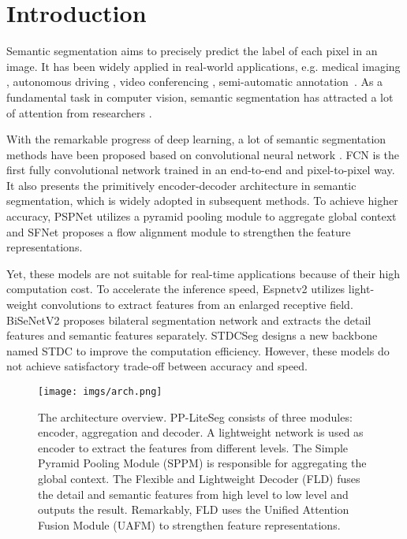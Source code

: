 \documentclass[10pt,twocolumn,letterpaper]{article}
\begin{document}
\section{Introduction}
\label{sec:introdution}



Semantic segmentation aims to precisely predict the label of each pixel in an image.
It has been widely applied in real-world applications, e.g. medical imaging \cite{zhou2018unet++}, autonomous driving \cite{siam2018comparative, hou2019learning}, video conferencing \cite{chu2022pp}, semi-automatic annotation~\cite{hao2021edgeflow}. As a fundamental task in computer vision, semantic segmentation has attracted a lot of attention from researchers \cite{liu2021paddleseg, lateef2019survey}.

With the remarkable progress of deep learning, a lot of semantic segmentation methods have been proposed based on convolutional neural network \cite{long2015fully, zhao2017pyramid, chen2018encoder, li2020semantic, yu2021bisenet}. 
FCN \cite{long2015fully} is the first fully convolutional network trained in an end-to-end and pixel-to-pixel way.
It also presents the primitively encoder-decoder architecture in semantic segmentation, which is widely adopted in subsequent methods.
To achieve higher accuracy, PSPNet \cite{zhao2017pyramid} utilizes a pyramid pooling module to aggregate global context and SFNet \cite{li2020semantic} proposes a flow alignment module to strengthen the feature representations.

Yet, these models are not suitable for real-time applications because of their high computation cost. To accelerate the inference speed, Espnetv2\cite{mehta2019espnetv2} utilizes light-weight convolutions to extract features from an enlarged receptive field.
BiSeNetV2 \cite{yu2021bisenet} proposes bilateral segmentation network and extracts the detail features and semantic features separately.
STDCSeg \cite{fan2021rethinking} designs a new backbone named STDC to improve the computation efficiency.
However, these models do not achieve satisfactory trade-off between accuracy and speed.


\begin{figure*}[t]
  \centering
   \texttt{[image: imgs/arch.png]}
   \caption{The architecture overview. PP-LiteSeg consists of three modules: encoder, aggregation and decoder. A lightweight network is used as encoder to extract the features from different levels. The Simple Pyramid Pooling Module (SPPM) is responsible for aggregating the global context. The Flexible and Lightweight Decoder (FLD) fuses the detail and semantic features from high level to low level and outputs the result. Remarkably, FLD uses the Unified Attention Fusion Module (UAFM) to strengthen feature representations. }
   \label{fig:arch}
\end{figure*}
\end{document}
